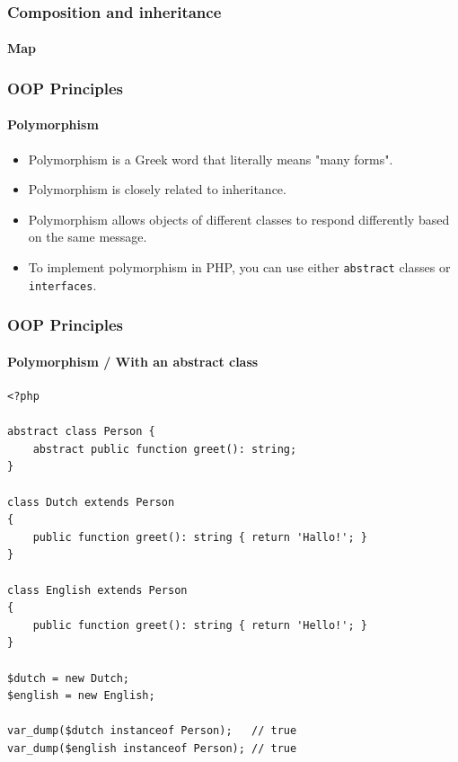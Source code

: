 \begin{frame}[fragile,c]
    \frametitle{Composition and inheritance}
    \framesubtitle{Map}

\end{frame}

\begin{frame}
    \frametitle{OOP Principles}
    \framesubtitle{Polymorphism}

    \begin{itemize}[<+->]
        \item Polymorphism is a Greek word that literally means "many forms".
        \item Polymorphism is closely related to inheritance.
        \item Polymorphism allows objects of different classes to respond differently based on the same message.
        \item To implement polymorphism in PHP, you can use either \texttt{abstract} classes or \texttt{interfaces}.
    \end{itemize}
\end{frame}

\begin{frame}[fragile,c]
    \frametitle{OOP Principles}
    \framesubtitle{Polymorphism / With an abstract class}

    \begin{lstlisting}
<?php

abstract class Person {
    abstract public function greet(): string;
}

class Dutch extends Person
{
    public function greet(): string { return 'Hallo!'; }
}

class English extends Person
{
    public function greet(): string { return 'Hello!'; }
}

$dutch = new Dutch;
$english = new English;

var_dump($dutch instanceof Person);   // true
var_dump($english instanceof Person); // true
    \end{lstlisting}
\end{frame}

